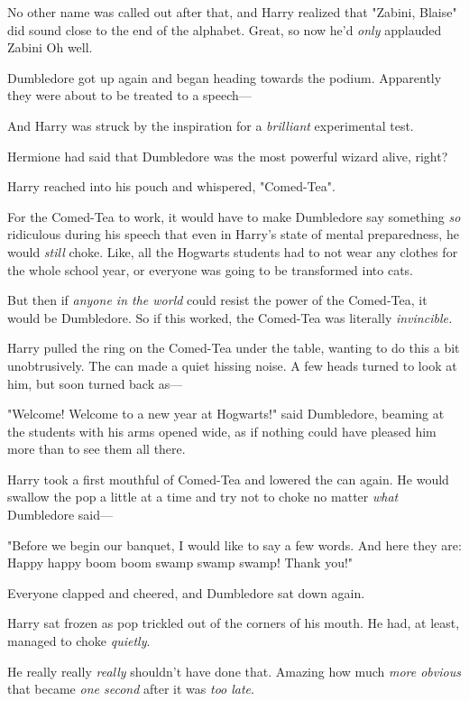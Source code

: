 No other name was called out after that, and Harry realized that "Zabini,
Blaise" did sound close to the end of the alphabet. Great, so now he'd
\emph{only} applauded Zabini{\el} Oh well.

Dumbledore got up again and began heading towards the podium. Apparently they
were about to be treated to a speech\mbox{---}

And Harry was struck by the inspiration for a \emph{brilliant} experimental
test.

Hermione had said that Dumbledore was the most powerful wizard alive, right?

Harry reached into his pouch and whispered, "Comed-Tea".

For the Comed-Tea to work, it would have to make Dumbledore say something
\emph{so} ridiculous during his speech that even in Harry's state of mental
preparedness, he would \emph{still} choke. Like, all the Hogwarts students had
to not wear any clothes for the whole school year, or everyone was going to be
transformed into cats.

But then if \emph{anyone in the world} could resist the power of the Comed-Tea,
it would be Dumbledore. So if this worked, the Comed-Tea was literally
\emph{invincible.}

Harry pulled the ring on the Comed-Tea under the table, wanting to do this a
bit unobtrusively. The can made a quiet hissing noise. A few heads turned to
look at him, but soon turned back as\mbox{---}

"Welcome! Welcome to a new year at Hogwarts!" said Dumbledore, beaming at the
students with his arms opened wide, as if nothing could have pleased him more
than to see them all there.

Harry took a first mouthful of Comed-Tea and lowered the can again. He would
swallow the pop a little at a time and try not to choke no matter \emph{what}
Dumbledore said\mbox{---}

"Before we begin our banquet, I would like to say a few words. And here they
are: Happy happy boom boom swamp swamp swamp! Thank you!"

Everyone clapped and cheered, and Dumbledore sat down again.

Harry sat frozen as pop trickled out of the corners of his mouth. He had, at
least, managed to choke \emph{quietly}.

He really really \emph{really} shouldn't have done that. Amazing how much \emph{
more obvious} that became \emph{one second} after it was \emph{too late}.

